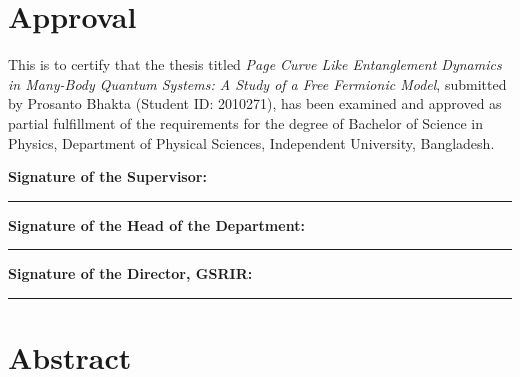 \documentclass[12pt,oneside,openright]{report}
\theoremstyle{definition}
\theoremstyle{plain}
\theoremstyle{remark}
\begin{document}
\cleardoublepage

\chapter*{Approval}

This is to certify that the thesis titled
\textit{Page Curve Like Entanglement Dynamics in Many-Body Quantum Systems: A Study of a Free Fermionic Model},
submitted by Prosanto Bhakta (Student ID: 2010271), has been examined and approved
as partial fulfillment of the requirements for the degree of Bachelor of Science in Physics,
Department of Physical Sciences, Independent University, Bangladesh.

\vspace{2cm}

\noindent\begin{minipage}[t]{0.62\textwidth}
\textbf{Signature of the Supervisor:}\\

\end{minipage}\hfill
\begin{minipage}[t]{0.34\textwidth}
\rule{\linewidth}{0.4pt}
\end{minipage}

\vspace{0.8cm}

\noindent\begin{minipage}[t]{0.62\textwidth}
\textbf{Signature of the Head of the Department:}\\
\end{minipage}\hfill
\begin{minipage}[t]{0.34\textwidth}
\rule{\linewidth}{0.4pt}
\end{minipage}

\vspace{0.8cm}

\noindent\begin{minipage}[t]{0.62\textwidth}
\textbf{Signature of the Director, GSRIR:}\\

\end{minipage}\hfill
\begin{minipage}[t]{0.34\textwidth}
\rule{\linewidth}{0.4pt}
\end{minipage}

\vspace{1.5cm}


\cleardoublepage

\chapter*{Abstract}
\end{document}
